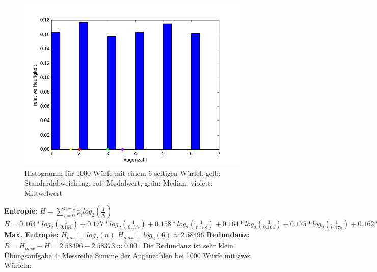 \documentclass[fleqn,a4paper,12pt]{article}
\begin{document}
  \begin{figure}
    \includegraphics[width=1.0\textwidth]{histo2.png}
    \caption{Histogramm für 1000 Würfe mit einem 6-seitigen Würfel. \newline gelb: Standardabweichung, rot: Modalwert, grün: Median, violett: Mittwelwert}
  \end{figure}
  \textbf{Entropie:} \newline
  $H = \sum_{i=0}^{n-1} p_i log_2(\frac{1}{p_i})$ \newline
  $H = 0.164*log_2(\frac{1}{0.164}) + 0.177*log_2(\frac{1}{0.177}) + 0.158*log_2(\frac{1}{0.158}) + 0.164*log_2(\frac{1}{0.164}) + 0.175*log_2(\frac{1}{0.175}) + 0.162*log_2(\frac{1}{0.162}) \approx 2.58373$ \newline
  \textbf{Max. Entropie:} \newline
  $H_{max} = log_2(n)$ \newline
  $H_{max} = log_2(6) \approx 2.58496$ \newline
  \textbf{Redundanz:} \newline
  $R = H_{max} - H = 2.58496 - 2.58373 \approx 0.001$ \newline
  Die Redundanz ist sehr klein. \newline \newline
  Übungsaufgabe 4: \newline
  Messreihe Summe der Augenzahlen bei 1000 Würfe mit zwei Würfeln: \newline
\end{document}
